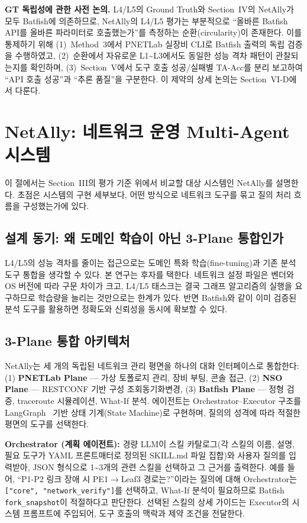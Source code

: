 \documentclass[journal]{IEEEtran}
\begin{document}
\textbf{GT 독립성에 관한 사전 논의.} L4/L5의 Ground Truth와 Section~IV의 NetAlly가 모두 Batfish에 의존하므로, NetAlly의 L4/L5 평가는 부분적으로 ``올바른 Batfish API를 올바른 파라미터로 호출했는가''를 측정하는 순환(circularity)이 존재한다. 이를 통제하기 위해 (1)~Method~3에서 PNETLab 실장비 CLI로 Batfish 출력의 독립 검증을 수행하였고, (2)~순환에서 자유로운 L1\textasciitilde L3에서도 동일한 성능 격차 패턴이 관찰되는지를 확인하며, (3)~Section~V에서 도구 호출 성공/실패별 TA-Acc를 분리 보고하여 ``API 호출 성공''과 ``추론 품질''을 구분한다. 이 제약의 상세 논의는 Section~VI-D에서 다룬다.

\section{NetAlly: 네트워크 운영 Multi-Agent 시스템}
\noindent 이 절에서는 Section~III의 평가 기준 위에서 비교할 대상 시스템인 NetAlly를 설명한다. 초점은 시스템의 구현 세부보다, 어떤 방식으로 네트워크 도구를 묶고 질의 처리 흐름을 구성했는가에 있다.
\subsection{설계 동기: 왜 도메인 학습이 아닌 3-Plane 통합인가}
L4/L5의 성능 격차를 줄이는 접근으로는 도메인 특화 학습(fine-tuning)과 기존 분석 도구 통합을 생각할 수 있다. 본 연구는 후자를 택한다. 네트워크 설정 파일은 벤더와 OS 버전에 따라 구문 차이가 크고, L4/L5 태스크는 결국 그래프 알고리즘의 실행을 요구하므로 학습량을 늘리는 것만으로는 한계가 있다. 반면 Batfish와 같이 이미 검증된 분석 도구를 활용하면 정확도와 신뢰성을 동시에 확보할 수 있다.

\subsection{3-Plane 통합 아키텍처}
NetAlly는 세 개의 독립된 네트워크 관리 평면을 하나의 대화 인터페이스로 통합한다: (1) \textbf{PNETLab Plane} --- 가상 토폴로지 관리, 장비 부팅, 콘솔 접근, (2) \textbf{NSO Plane} --- RESTCONF 기반 구성 조회\textperiodcentered 동기화\textperiodcentered 변경, (3) \textbf{Batfish Plane} --- 정형 검증, traceroute 시뮬레이션, What-If 분석. 에이전트는 Orchestrator--Executor 구조를 LangGraph~\cite{ref3} 기반 상태 기계(State Machine)로 구현하며, 질의의 성격에 따라 적절한 평면의 도구를 선택한다.

\textbf{Orchestrator (계획 에이전트):} 경량 LLM이 스킬 카탈로그(각 스킬의 이름, 설명, 필요 도구가 YAML 프론트매터로 정의된 SKILL.md 파일 집합)와 사용자 질의를 입력받아, JSON 형식으로 1\textasciitilde3개의 관련 스킬을 선택하고 그 근거를 출력한다. 예를 들어, ``P1-P2 링크 장애 시 PE1$\rightarrow$Leaf3 경로는?''이라는 질의에 대해 Orchestrator는 \texttt{["core", "network\_verify"]}를 선택하고, What-If 분석이 필요하므로 Batfish \texttt{fork\_snapshot}이 적절하다고 판단한다. 선택된 스킬의 상세 가이드는 Executor의 시스템 프롬프트에 주입되어, 도구 호출의 맥락과 제약 조건을 전달한다.
\end{document}
